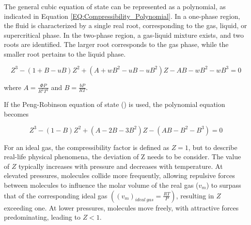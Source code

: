 \documentclass[../Article_Model_Parameters.tex]{subfiles}
\begin{document}
	\begin{table}[h!]
		\centering
		\caption{Parameters for Popular Cubic EoS}
		\label{tab:Popular_Cubic_EoS_alpha}
	\end{table}
	
	The general cubic equation of state can be represented as a polynomial, as indicated in Equation \ref{EQ:Compressibility_Polynomial}. In a one-phase region, the fluid is characterized by a single real root, corresponding to the gas, liquid, or supercritical phase. In the two-phase region, a gas-liquid mixture exists, and two roots are identified. The larger root corresponds to the gas phase, while the smaller root pertains to the liquid phase.
	
	{\footnotesize
		\begin{equation}
			\label{EQ:Compressibility_Polynomial}
			Z^3 - (1+B-uB)Z^2+(A+wB^2-uB-uB^2)Z - AB - wB^2 - wB^3 = 0
	\end{equation} }

	where $A=\frac{\Phi P}{R^2T^2}$ and $B=\frac{bP}{RT}$.
	
	If the Peng-Robinson equation of state (\citet{Peng1976}) is used, the polynomial equation becomes
	
	{\footnotesize
	\begin{equation}
		\label{EQ:Peng_Robinson_Polynomial}
		Z^3 - (1-B)Z^2+(A-2B-3B^2)Z -(AB-B^2-B^3) = 0
	\end{equation} }
	
	For an ideal gas, the compressibility factor is defined as $Z = 1$, but to describe real-life physical phenomena, the deviation of Z needs to be consider. The value of $Z$ typically increases with pressure and decreases with temperature. At elevated pressures, molecules collide more frequently, allowing repulsive forces between molecules to influence the molar volume of the real gas ($v_m$) to surpass that of the corresponding ideal gas $\left( \left(v_m\right)_{ideal~gas} = \frac{RT}{P} \right)$, resulting in $Z$ exceeding one. At lower pressures, molecules move freely, with attractive forces predominating, leading to $Z < 1$.
	
\end{document}
